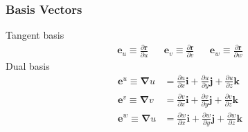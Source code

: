 \subsubsection{Basis Vectors}
Tangent basis
\begin{align}
\label{eqn:basis_i}
\bm e_u\equiv \frac{\partial\bm r}{\partial u} && \bm e_v\equiv \frac{\partial\bm r}{\partial v} && \bm e_w\equiv \frac{\partial\bm r}{\partial w}
\end{align}
Dual basis
\begin{equation}
\label{eqn:basis^i}
\begin{aligned}
\bm e^u \equiv \bm \nabla u &= \frac{\partial u}{\partial x} \bm i + \frac{\partial u}{\partial y} \bm j + \frac{\partial u}{\partial z} \bm k\\ 
\bm e^v \equiv \bm \nabla v &= \frac{\partial v}{\partial x} \bm i + \frac{\partial v}{\partial y} \bm j + \frac{\partial v}{\partial z} \bm k\\
\bm e^w \equiv \bm \nabla u &= \frac{\partial w}{\partial x} \bm i + \frac{\partial w}{\partial y} \bm j + \frac{\partial w}{\partial z} \bm k
\end{aligned}
\end{equation}